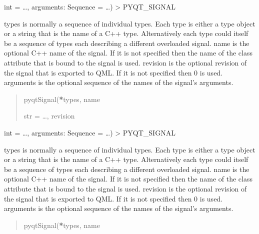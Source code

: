 \documentclass[letterpaper,10pt,english]{sphinxmanual}
\begin{document}
\begin{fulllineitems}
\begin{fulllineitems}
\label{\detokenize{source/GUIWidgets:GUIWidgets.PlaneWaveWidget.isDeleted}}
\pysigstartsignatures
\pysigline
{}
\pysigstopsignatures
\sphinxAtStartPar
int = …, arguments: Sequence = …) \sphinxhyphen{}\textgreater{} PYQT\_SIGNAL

\sphinxAtStartPar
types is normally a sequence of individual types.  Each type is either a
type object or a string that is the name of a C++ type.  Alternatively
each type could itself be a sequence of types each describing a different
overloaded signal.
name is the optional C++ name of the signal.  If it is not specified then
the name of the class attribute that is bound to the signal is used.
revision is the optional revision of the signal that is exported to QML.
If it is not specified then 0 is used.
arguments is the optional sequence of the names of the signal’s arguments.
\begin{quote}\begin{description}
\sphinxAtStartPar
pyqtSignal({\color{red}\bfseries{}*}types, name

\sphinxAtStartPar
str = …, revision

\end{description}\end{quote}

\end{fulllineitems}


\begin{fulllineitems}
\label{\detokenize{source/GUIWidgets:GUIWidgets.PlaneWaveWidget.isSet}}
\pysigstartsignatures
\pysigline
{}
\pysigstopsignatures
\sphinxAtStartPar
int = …, arguments: Sequence = …) \sphinxhyphen{}\textgreater{} PYQT\_SIGNAL

\sphinxAtStartPar
types is normally a sequence of individual types.  Each type is either a
type object or a string that is the name of a C++ type.  Alternatively
each type could itself be a sequence of types each describing a different
overloaded signal.
name is the optional C++ name of the signal.  If it is not specified then
the name of the class attribute that is bound to the signal is used.
revision is the optional revision of the signal that is exported to QML.
If it is not specified then 0 is used.
arguments is the optional sequence of the names of the signal’s arguments.
\begin{quote}\begin{description}
\sphinxAtStartPar
pyqtSignal({\color{red}\bfseries{}*}types, name


\end{description}
\end{quote}
\end{fulllineitems}
\end{fulllineitems}
\end{document}
